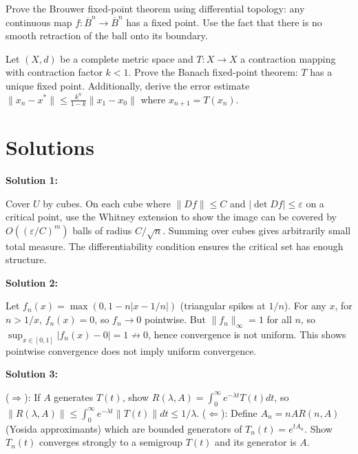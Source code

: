 \documentclass[12pt,a4paper]{exam}
\begin{document}
\begin{questions}
\vspace{0.3cm}

\question[7]
Prove the Brouwer fixed-point theorem using differential topology: any continuous map $f: \overline{B}^n \to \overline{B}^n$ has a fixed point. Use the fact that there is no smooth retraction of the ball onto its boundary.

\vspace{0.3cm}

\question[3]
Let $(X, d)$ be a complete metric space and $T: X \to X$ a contraction mapping with contraction factor $k < 1$. Prove the Banach fixed-point theorem: $T$ has a unique fixed point. Additionally, derive the error estimate $\|x_n - x^*\| \leq \frac{k^n}{1-k} \|x_1 - x_0\|$ where $x_{n+1} = T(x_n)$.

\vspace{0.3cm}

\end{questions}

\newpage
\section*{Solutions}

\textbf{Solution 1:}

Cover $U$ by cubes. On each cube where $\|Df\| \leq C$ and $|\det Df| \leq \varepsilon$ on a critical point, use the Whitney extension to show the image can be covered by $O((\varepsilon/C)^{m})$ balls of radius $C/\sqrt{n}$. Summing over cubes gives arbitrarily small total measure. The differentiability condition ensures the critical set has enough structure.

\vspace{0.5cm}

\textbf{Solution 2:}

Let $f_n(x) = \max(0, 1 - n|x - 1/n|)$ (triangular spikes at $1/n$). For any $x$, for $n > 1/x$, $f_n(x) = 0$, so $f_n \to 0$ pointwise. But $\|f_n\|_\infty = 1$ for all $n$, so $\sup_{x \in [0,1]} |f_n(x) - 0| = 1 \not\to 0$, hence convergence is not uniform. This shows pointwise convergence does not imply uniform convergence.

\vspace{0.5cm}

\textbf{Solution 3:}

($\Rightarrow$): If $A$ generates $T(t)$, show $R(\lambda,A) = \int_0^\infty e^{-\lambda t} T(t) dt$, so $\|R(\lambda,A)\| \leq \int_0^\infty e^{-\lambda t} \|T(t)\| dt \leq 1/\lambda$. ($\Leftarrow$): Define $A_n = nAR(n,A)$ (Yosida approximants) which are bounded generators of $T_n(t) = e^{t A_n}$. Show $T_n(t)$ converges strongly to a semigroup $T(t)$ and its generator is $A$.
\end{document}
